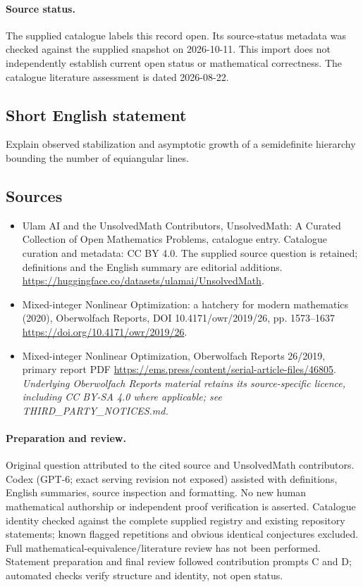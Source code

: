 \documentclass[11pt]{article}
\begin{document}
\paragraph{Source status.}
The supplied catalogue labels this record open. Its source-status metadata was checked against the supplied snapshot on 2026-10-11. This import does not independently establish current open status or mathematical correctness. The catalogue literature assessment is dated 2026-08-22.
\subsection{Short English statement}
Explain observed stabilization and asymptotic growth of a semidefinite hierarchy bounding the number of equiangular lines.
\subsection{Sources}
\begin{itemize}
\item[\hypertarget{source:statement:1}{S1}] Ulam AI and the UnsolvedMath Contributors, UnsolvedMath: A Curated Collection of Open Mathematics Problems, catalogue entry. Catalogue curation and metadata: CC BY 4.0. The supplied source question is retained; definitions and the English summary are editorial additions.
\url{https://huggingface.co/datasets/ulamai/UnsolvedMath}.
\item[\hypertarget{source:statement:2}{S2}] Mixed-integer Nonlinear Optimization: a hatchery for modern mathematics (2020), Oberwolfach Reports, DOI 10.4171/owr/2019/26, pp. 1573--1637
\url{https://doi.org/10.4171/owr/2019/26}.
\item[\hypertarget{source:statement:3}{S3}] Mixed-integer Nonlinear Optimization, Oberwolfach Reports 26/2019, primary report PDF
\url{https://ems.press/content/serial-article-files/46805}.
\textit{Underlying Oberwolfach Reports material retains its source-specific licence, including CC BY-SA 4.0 where applicable; see THIRD\_PARTY\_NOTICES.md.}
\end{itemize}
\paragraph{Preparation and review.}
Original question attributed to the cited source and UnsolvedMath contributors. Codex (GPT-6; exact serving revision not exposed) assisted with definitions, English summaries, source inspection and formatting. No new human mathematical authorship or independent proof verification is asserted. Catalogue identity checked against the complete supplied registry and existing repository statements; known flagged repetitions and obvious identical conjectures excluded. Full mathematical-equivalence/literature review has not been performed. Statement preparation and final review followed contribution prompts C and D; automated checks verify structure and identity, not open status.
\label{end:statement}
\end{document}
